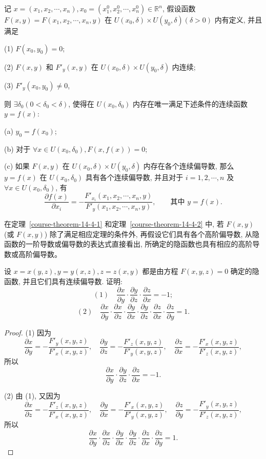 \documentclass[UTF8,12pt,a4paper,fontset=fandol]{ctexart}
\begin{document}
\begin{theorem}[隐函数存在定理]\label{course-theorem-14-4-2}\quad 记 $x=(x_1,x_2,\cdots,x_n),x_0=(x_1^0,x_2^0,\cdots,x_n^0)\in\mathbb R^n$, 假设函数 $F(x,y)=F(x_1,x_2,\cdots,x_n,y)$ 在 $U(x_0,\delta)\times U(y_0,\delta)(\delta>0)$ 内有定义, 并且满足

(1) $F(x_0,y_0)=0$;

(2) $F(x,y)$ 和 $F'_y(x,y)$ 在 $U(x_0,\delta)\times U(y_0,\delta)$ 内连续;

(3) $F'_y(x_0,y_0)\ne0$,

则 $\exists\delta_0(0<\delta_0<\delta)$, 使得在 $U(x_0,\delta_0)$ 内存在唯一满足下述条件的连续函数 $y=f(x)$:

(a) $y_0=f(x_0)$;

(b) 对于 $\forall x\in U(x_0,\delta_0),F(x,f(x))=0$;

(c) 如果 $F(x,y)$ 在 $U(x_0,\delta)\times U(y_0,\delta)$ 内存在各个连续偏导数, 那么 $y=f(x)$ 在 $U(x_0,\delta_0)$ 具有各个连续偏导数, 并且对于 $i=1,2,\cdots,n$ 及 $\forall x\in U(x_0,\delta_0)$, 有
\[
  \frac{\partial f(x)}{\partial x_i}
  =-\frac{F'_{x_i}(x_1,x_2,\cdots,x_n,y)}
  {F'_y(x_1,x_2,\cdots,x_n,y)},\qquad
  \text{其中 }y=f(x).
\]

\end{theorem}
\begin{remark}\quad 在定理~\ref{course-theorem-14-4-1}  和定理~\ref{course-theorem-14-4-2}  中, 若 $F(x,y)$ (或 $F(x,y)$) 除了满足相应定理的条件外, 再假设它们具有各个高阶偏导数, 从隐函数的一阶导数或偏导数的表达式直接看出, 所确定的隐函数也具有相应的高阶导数或高阶偏导数。

\end{remark}
\begin{example}\label{course-example-14-4-1}\quad 设 $x=x(y,z),y=y(x,z),z=z(x,y)$ 都是由方程 $F(x,y,z)=0$ 确定的隐函数, 并且它们具有连续偏导数. 证明:
\[
  (1)\quad \frac{\partial x}{\partial y}\cdot
  \frac{\partial y}{\partial z}\cdot
  \frac{\partial z}{\partial x}=-1;
\]
\[
  (2)\quad \frac{\partial x}{\partial y}\cdot
  \frac{\partial x}{\partial z}\cdot
  \frac{\partial y}{\partial x}\cdot
  \frac{\partial y}{\partial z}\cdot
  \frac{\partial z}{\partial x}\cdot
  \frac{\partial z}{\partial y}=1.
\]

\end{example}
\begin{proof}\quad (1) 因为
\[
  \frac{\partial x}{\partial y}=-\frac{F'_y(x,y,z)}{F'_x(x,y,z)},\quad
  \frac{\partial y}{\partial z}=-\frac{F'_z(x,y,z)}{F'_y(x,y,z)},\quad
  \frac{\partial z}{\partial x}=-\frac{F'_x(x,y,z)}{F'_z(x,y,z)},
\]
所以
\[
  \frac{\partial x}{\partial y}\cdot
  \frac{\partial y}{\partial z}\cdot
  \frac{\partial z}{\partial x}=-1.
\]

(2) 由 (1), 又因为
\[
  \frac{\partial x}{\partial z}=-\frac{F'_z(x,y,z)}{F'_x(x,y,z)},\quad
  \frac{\partial y}{\partial x}=-\frac{F'_x(x,y,z)}{F'_y(x,y,z)},\quad
  \frac{\partial z}{\partial y}=-\frac{F'_y(x,y,z)}{F'_z(x,y,z)},
\]
所以
\[
  \frac{\partial x}{\partial y}\cdot
  \frac{\partial x}{\partial z}\cdot
  \frac{\partial y}{\partial x}\cdot
  \frac{\partial y}{\partial z}\cdot
  \frac{\partial z}{\partial x}\cdot
  \frac{\partial z}{\partial y}=1.
\]

\end{proof}
\end{document}
